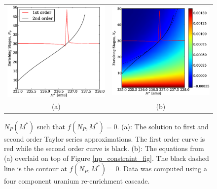\documentclass{ansconf}
\begin{document}
\begin{figure}[htpb]
\begin{center}
\begin{tabular}{cc}
\includegraphics[scale=0.375]{np_closed.eps} & 
                                \includegraphics[scale=0.375]{np_closed_overlay.eps} \\
(a) & (b) \\
\end{tabular}
\caption{$N_P(M^*)$ such that $f(N_P,M^*)=0$.  (a): The solution to first and 
second order Taylor series approximations.  The first order curve is red while the 
second order curve is black. (b): The equations from (a) overlaid on top of Figure 
\ref{np_constraint_fig}.  The black dashed line is the contour at $f(N_P, M^*)=0$. 
Data was computed using a four component uranium re-enrichment cascade.}
\label{np_closed_fig}
\end{center}
\end{figure}
\end{document}
